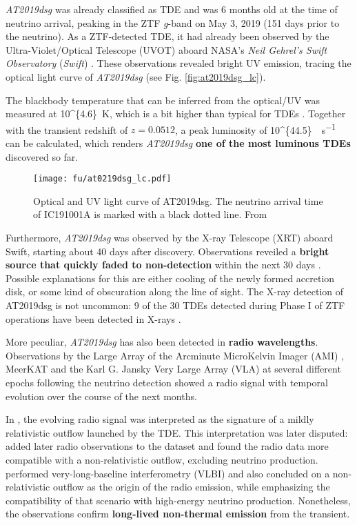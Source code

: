 \emph{AT2019dsg} was already classified as TDE and was 6 months old at the time of neutrino arrival, peaking in the ZTF \textit{g}-band on May 3, 2019 (151 days prior to the neutrino). As a ZTF-detected TDE, it had already been observed by the Ultra-Violet/Optical Telescope (UVOT)  aboard NASA's \textit{Neil Gehrel's Swift Observatory} (\textit{Swift}) . These observations revealed bright UV emission, tracing the optical light curve of \emph{AT2019dsg} (see Fig. \ref{fig:at2019dsg_lc}).

The blackbody temperature that can be inferred from the optical/UV was measured at \SI[parse-numbers = false]{10^{4.6}}{\K}, which is a bit higher than typical for TDEs . Together with the transient redshift of $z=0.0512$, a peak luminosity of \SI[parse-numbers = false]{10^{44.5}}{\erg\per\s} can be calculated, which renders \emph{AT2019dsg} \textbf{one of the most luminous TDEs} discovered so far.


\begin{figure*}[htb]
    \texttt{[image: fu/at0219dsg\_lc.pdf]}
    \caption[AT2019dsg optical/UV light curve]{Optical and UV light curve of AT2019dsg. The neutrino arrival time of IC191001A is marked with a black dotted line. From \cite{Stein2021}}
\end{figure*}

Furthermore, \emph{AT2019dsg} was observed by the X-ray Telescope (XRT)  aboard Swift, starting about 40 days after discovery. Observations reveiled a \textbf{bright source that quickly faded to non-detection} within the next 30 days \cite{Stein2021}. Possible explanations for this are either cooling of the newly formed accretion disk, or some kind of obscuration along the line of sight. The X-ray detection of AT2019dsg is not uncommon: 9 of the 30 TDEs detected during Phase I of ZTF operations have been detected in X-rays .

More peculiar, \emph{AT2019dsg} has also been detected in \textbf{radio wavelengths}. Observations by the Large Array of the Arcminute MicroKelvin Imager (AMI) , MeerKAT  and the Karl G. Jansky Very Large Array (VLA)  at several different epochs following the neutrino detection showed a radio signal with temporal evolution over the course of the next months.

In \cite{Stein2021}, the evolving radio signal was interpreted as the signature of a mildly relativistic outflow launched by the TDE. This interpretation was later disputed:  added later radio observations to the dataset and found the radio data more compatible with a non-relativistic outflow, excluding neutrino production.  performed very-long-baseline interferometry (VLBI) and also concluded on a non-relativistic outflow as the origin of the radio emission, while emphasizing the compatibility of that scenario with high-energy neutrino production. Nonetheless, the observations confirm \textbf{long-lived non-thermal emission} from the transient.


